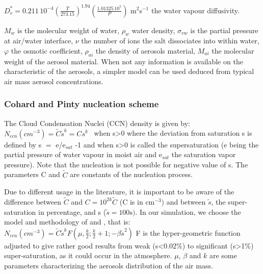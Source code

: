 $D_{v}^{\ast }=0.211\, {10}^{-4}\left( \frac{T}{273.15} \right)^{1.94}\left(
\frac{1.01325\, {10}^{5}}{P} \right)$ m$^{2}$s$^{-1}$ the water vapour
diffusivity.

$M_{w}$ is the molecular weight of water, $\rho_{w}$ water density,
$\sigma_{vw}$ is the partial pressure at air/water interface,
\newline
$\nu $ the number of ions the salt dissociates into within water,
\newline
$\varphi $ the osmotic coefficient, $\rho_{ai}$ the density of aerosols material,
\newline
$M_{ai}$ the molecular weight of the aerosol material.
\newline
When not any information is available on the characteristic of the aerosols,
a simpler model can be used deduced from typical air mass aerosol
concentrations.

\subsubsection{Cohard and Pinty nucleation scheme}

The Cloud Condensation Nuclei (CCN) density is given by:
\newline
$N_{ccn}\left( {cm}^{-3} \right)=\tilde{C}\tilde{s}^{k}=Cs^{k}\, \, \, \, \,
$when s\textgreater 0
\newline
where the deviation from saturation s is defined by s $=$ e/e$_{sat}$ -1 and
\newline
when s\textgreater 0 is called the supersaturation (e being the partial
pressure of water vapour in moist air and e$_{sat}$ the saturation vapor
pressure). Note that the nucleation is not possible for negative value of s.
The parameters C and $\tilde{C}$ are constants of the nucleation
process.

Due to different usage in the literature, it is important to be aware of the
difference between $\tilde{C}$ and $C=10^{2k}\tilde{C}$ (C is in cm$^{-3})$ and
between $\tilde{s}$, the super-saturation in percentage, and s
($\tilde{s}=100\mbox{s})$.
\newline
\newline
In our simulation, we choose the model and methodology of
\cite{Cohard:1998} and \cite{Cohard:2000}, that is: $N_{ccn}\left(
{cm}^{-3} \right)=\tilde{C}\tilde{s}^{k}F\left( \mu
,\frac{k}{2};\frac{k}{2}+1;-\beta \tilde{s}^{2} \right)$
\newline
F is the hyper-geometric function adjusted to give rather good results from
weak (s\textless 0.02{\%}) to significant (s\textgreater 1{\%})
super-saturation, as it could occur in the atmosphere. $\mu$, $\beta $ and $k$ are
some parameters characterizing the aerosols distribution of the air mass.

